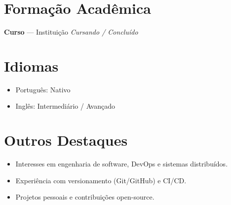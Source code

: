 \documentclass[a4paper,10pt]{article}
\begin{document}
\section*{Formação Acadêmica}
\textbf{Curso} — Instituição \hfill \textit{Cursando / Concluído}

\section*{Idiomas}
\begin{itemize}[leftmargin=1.2em, noitemsep, topsep=3pt]
    \item Português: Nativo
    \item Inglês: Intermediário / Avançado
\end{itemize}

\section*{Outros Destaques}
\begin{itemize}[leftmargin=1.2em, noitemsep, topsep=3pt]
    \item Interesses em engenharia de software, DevOps e sistemas distribuídos.
    \item Experiência com versionamento (Git/GitHub) e CI/CD.
    \item Projetos pessoais e contribuições open-source.
\end{itemize}
\end{document}
